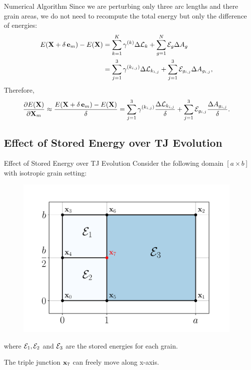 \documentclass[usenames,dvipsnames]{beamer}
\begin{document}
\begin{frame}{Numerical Algorithm}
Since we are perturbing only three arc lengths and there grain areas, we do not need to recompute the total energy but only the difference of energies:
\begin{align*}
    E(\X+\delta\,  \ei{m}) - E(\X) &=
    \sum_{k =1}^K \gamma^{(k)}\Delta{\AL}_{k} +
     \sum_{g=1}^N \SE_{g}\Delta{A}_{g}\\
    &= \sum_{j=1}^3 \gamma^{(k_{i,j})} \Delta \AL_{k_{i,j}} + \sum_{j=1}^3 \SE_{g_{i,j}} \Delta A_{g_{i,j}},
\end{align*}
Therefore,
\begin{equation*}
    \frac{\partial E(\X)}{\partial \X_m} \approx
    \frac{E(\X+\delta\,  \ei{m}) - E(\X)}{\delta} = \sum_{j=1}^3 \gamma^{(k_{i,j})}  \frac{\Delta \AL_{k_{i,j}}}{\delta}+ \sum_{j=1}^3 \SE_{g_{i,j}} \frac{\Delta A_{g_{i,j}}}{\delta}.
\end{equation*}
\end{frame}


\subsection[Effect of Stored Energy over TJ]{Effect of Stored Energy over TJ Evolution}
\begin{frame}{Effect of Stored Energy over TJ Evolution}
    Consider the following domain $[a \times b]$ with isotropic grain setting:
    \begin{figure}
        \centering
        \includegraphics[trim={1em 2em 1em 3em}, clip=true, scale=0.5]{figures/stored_energy/SE_analysis.pdf}
    \end{figure}
    where $\mathcal{E}_1, \mathcal{E}_2$ and $\mathcal{E}_3$ are the stored energies for each grain.

    The triple junction {\color{red}$\x_7$} can freely move along x-axis.
\end{frame}
\end{document}
